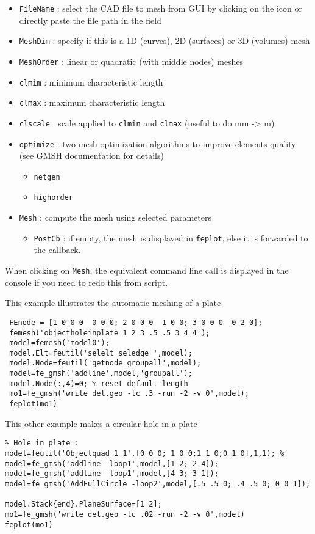 \begin{itemize}
\item {\tt FileName} : select the CAD file to mesh from GUI by clicking on the icon or directly paste the file path in the field
\item {\tt MeshDim} : specify if this is a 1D (curves), 2D (surfaces) or 3D (volumes) mesh
\item {\tt MeshOrder} : linear or quadratic (with middle nodes) meshes
\item {\tt clmim} : minimum characteristic length
\item {\tt clmax} : maximum characteristic length
\item {\tt clscale} : scale applied to {\tt clmin} and {\tt clmax} (useful to do mm -> m)
\item {\tt optimize} : two mesh optimization algorithms to improve elements quality (see GMSH documentation for details)
\begin{itemize}
\item {\tt netgen}
\item {\tt highorder}
\end{itemize}
\item {\tt Mesh} : compute the mesh using selected parameters
\begin{itemize}
\item {\tt PostCb} : if empty, the mesh is displayed in {\tt feplot}, else it is forwarded to the callback.
\end{itemize}
\end{itemize}

When clicking on {\tt Mesh}, the equivalent command line call is displayed in the console if you need to redo this from script.


This example illustrates the automatic meshing of a plate
\begin{verbatim}
 FEnode = [1 0 0 0  0 0 0; 2 0 0 0  1 0 0; 3 0 0 0  0 2 0];
 femesh('objectholeinplate 1 2 3 .5 .5 3 4 4');
 model=femesh('model0');
 model.Elt=feutil('selelt seledge ',model);
 model.Node=feutil('getnode groupall',model);
 model=fe_gmsh('addline',model,'groupall');
 model.Node(:,4)=0; % reset default length
 mo1=fe_gmsh('write del.geo -lc .3 -run -2 -v 0',model);
 feplot(mo1)
\end{verbatim}%



This other example makes a circular hole in a plate 
\begin{verbatim}
% Hole in plate :
model=feutil('Objectquad 1 1',[0 0 0; 1 0 0;1 1 0;0 1 0],1,1); %
model=fe_gmsh('addline -loop1',model,[1 2; 2 4]);
model=fe_gmsh('addline -loop1',model,[4 3; 3 1]);
model=fe_gmsh('AddFullCircle -loop2',model,[.5 .5 0; .4 .5 0; 0 0 1]);
 
model.Stack{end}.PlaneSurface=[1 2]; 
mo1=fe_gmsh('write del.geo -lc .02 -run -2 -v 0',model)
feplot(mo1)
\end{verbatim}%


